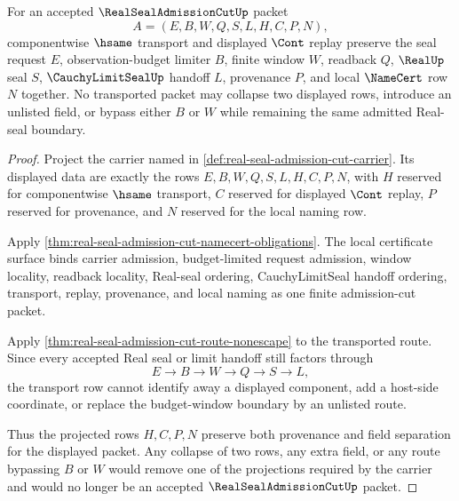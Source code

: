 \begin{theorem}
\label{thm:real-seal-admission-cut-transport-provenance-field-faithfulness}
For an accepted $\RealSealAdmissionCutUp$ packet
$$
A=(E,B,W,Q,S,L,H,C,P,N),
$$
componentwise $\hsame$ transport and displayed $\Cont$ replay preserve the seal request $E$, observation-budget limiter $B$, finite window $W$, readback $Q$, $\RealUp$ seal $S$, $\CauchyLimitSealUp$ handoff $L$, provenance $P$, and local $\NameCert$ row $N$ together. No transported packet may collapse two displayed rows, introduce an unlisted field, or bypass either $B$ or $W$ while remaining the same admitted Real-seal boundary.
\end{theorem}
\begin{proof}
Project the carrier named in \autoref{def:real-seal-admission-cut-carrier}. Its displayed data are exactly the rows $E,B,W,Q,S,L,H,C,P,N$, with $H$ reserved for componentwise $\hsame$ transport, $C$ reserved for displayed $\Cont$ replay, $P$ reserved for provenance, and $N$ reserved for the local naming row.

Apply \autoref{thm:real-seal-admission-cut-namecert-obligations}. The local certificate surface binds carrier admission, budget-limited request admission, window locality, readback locality, Real-seal ordering, CauchyLimitSeal handoff ordering, transport, replay, provenance, and local naming as one finite admission-cut packet.

Apply \autoref{thm:real-seal-admission-cut-route-nonescape} to the transported route. Since every accepted Real seal or limit handoff still factors through
$$
E \to B \to W \to Q \to S \to L ,
$$
the transport row cannot identify away a displayed component, add a host-side coordinate, or replace the budget-window boundary by an unlisted route.

Thus the projected rows $H,C,P,N$ preserve both provenance and field separation for the displayed packet. Any collapse of two rows, any extra field, or any route bypassing $B$ or $W$ would remove one of the projections required by the carrier and would no longer be an accepted $\RealSealAdmissionCutUp$ packet.
\end{proof}

